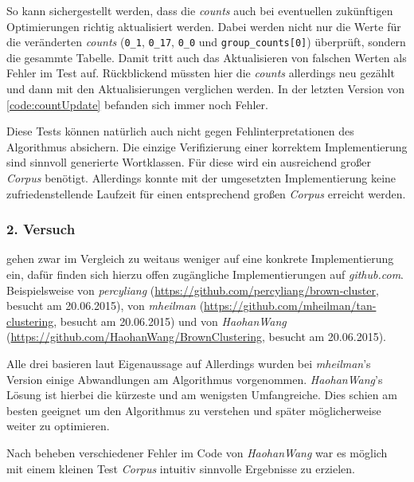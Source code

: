 		So kann sichergestellt werden, dass die \emph{counts} auch bei eventuellen zukünftigen Optimierungen richtig aktualisiert werden. Dabei werden nicht nur die Werte für die veränderten \emph{counts} (\texttt{0\_1}, \texttt{0\_17}, \texttt{0\_0} und \texttt{group\_counts[0]}) überprüft, sondern die gesammte Tabelle. Damit tritt auch das Aktualisieren von falschen Werten als Fehler im Test auf. Rückblickend müssten hier die \emph{counts} allerdings neu gezählt und dann mit den Aktualisierungen verglichen werden. In der letzten Version von \autoref{code:countUpdate} befanden sich immer noch Fehler.
		\newpage

		Diese Tests können natürlich auch nicht gegen Fehlinterpretationen des Algorithmus absichern. Die einzige Verifizierung einer korrektem Implementierung sind sinnvoll generierte Wortklassen. Für diese wird ein ausreichend großer \emph{Corpus} benötigt. Allerdings konnte mit der umgesetzten Implementierung keine zufriedenstellende Laufzeit für einen entsprechend großen \emph{Corpus} erreicht werden.

	\subsubsection*{2. Versuch}
        							
		\cite{cumpatationalLinguistics:classBasedNGramms} gehen zwar im Vergleich zu \cite{speechcommunication:exchange} weitaus weniger auf eine konkrete Implementierung ein, dafür finden sich hierzu offen zugängliche Implementierungen auf \emph{github.com}. Beispielsweise von \emph{percyliang} (\url{https://github.com/percyliang/brown-cluster}, besucht am 20.06.2015), von \emph{mheilman} (\url{https://github.com/mheilman/tan-clustering}, besucht am 20.06.2015) und von \emph{HaohanWang} (\url{https://github.com/HaohanWang/BrownClustering}, besucht am 20.06.2015).
            
		Alle drei basieren laut Eigenaussage auf \cite{cumpatationalLinguistics:classBasedNGramms} Allerdings wurden bei \emph{mheilman}'s Version einige Abwandlungen am Algorithmus vorgenommen. \emph{HaohanWang}'s Lösung ist hierbei die kürzeste und am wenigsten Umfangreiche. Dies schien am besten geeignet um den Algorithmus zu verstehen und später möglicherweise weiter zu optimieren. 
            
		Nach beheben verschiedener Fehler im Code von \emph{HaohanWang} war es möglich mit einem kleinen Test \emph{Corpus} intuitiv sinnvolle Ergebnisse zu erzielen.
            
